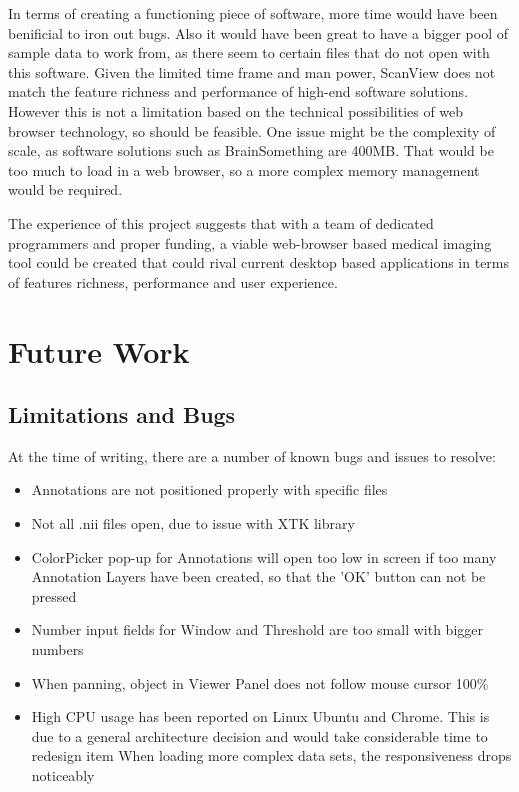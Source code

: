 \documentclass[a4paper,11pt,twoside]{article}
\begin{document}
In terms of creating a functioning piece of software, more time would have been benificial to iron out bugs. Also it would have been great to have a bigger pool of sample data to work from, as there seem to certain files that do not open with this software. Given the limited time frame and man power, ScanView does not match the feature richness and performance of high-end software solutions. However this is not a limitation based on the technical possibilities of web browser technology, so should be feasible. One issue might be the complexity of scale, as software solutions such as BrainSomething are 400MB. That would be too much to load in a web browser, so a more complex memory management would be required.

The experience of this project suggests that with a team of dedicated programmers and proper funding, a viable web-browser based medical imaging tool could be created that could rival current desktop based applications in terms of features richness, performance and user experience.



\newpage
\section{Future Work}


\subsection{Limitations and Bugs}

At the time of writing, there are a number of known bugs and issues to resolve:

\begin{itemize}

\item Annotations are not positioned properly with specific files
\item Not all .nii files open, due to issue with XTK library
\item ColorPicker pop-up for Annotations will open too low in screen if too many Annotation Layers have been created, so that the 'OK' button can not be pressed
\item Number input fields for Window and Threshold are too small with bigger numbers
\item When panning, object in Viewer Panel does not follow mouse cursor 100\%
\item High CPU usage has been reported on Linux Ubuntu and Chrome. This is due to a general architecture decision and would take considerable time to redesign
item When loading more complex data sets, the responsiveness drops noticeably

\end{itemize}
\end{document}
